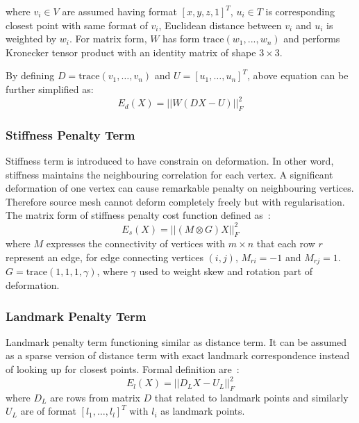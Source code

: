 where $v_i \in V$ are assumed having format $[x,y,z,1]^T$, $u_i \in T$ is corresponding closest point with same format of $v_i$, Euclidean distance between $v_i$ and $u_i$ is weighted by $w_i$. For matrix form, $W$ has form $\text{trace}(w_1,...,w_n)$ and performs Kronecker tensor product with an identity matrix of shape $3 \times 3$. 

By defining $D = \text{trace}(v_1,\dotsc,v_n)$ and $U=[u_1,\dotsc,u_n]^T$, above equation can be further simplified as:
\begin{equation}
E_d(X) = ||W(DX-U)||^2_F
\end{equation}

\subsubsection{Stiffness Penalty Term}
\label{sec:nicpst}

Stiffness term is introduced to have constrain on deformation. In other word, stiffness maintains the neighbouring  correlation for each vertex. A significant deformation of one vertex can cause remarkable penalty on neighbouring vertices. Therefore source mesh cannot deform completely freely but with regularisation. The matrix form of stiffness penalty cost function defined as~\cite{Amberg2007}:
\begin{equation}
E_s(X)=||(M \otimes G)X||^2_F
\end{equation}
where $M$ expresses the connectivity of vertices with $m \times n$ that each row $r$ represent an edge, for edge connecting vertices $(i,j)$, $M_{ri}=-1$ and $M_{rj}=1$. $G=\text{trace}(1,1,1,\gamma)$, where $\gamma$ used to weight skew and rotation part of deformation.

\subsubsection{Landmark Penalty Term}
\label{sec:nicplt}

Landmark penalty term functioning similar as distance term. It can be assumed as a sparse version of distance term with exact landmark correspondence instead of looking up for closest points. Formal definition are~\cite{Amberg2007}:
\begin{equation}
E_l(X)=||D_LX-U_L||^2_F
\end{equation}
where $D_L$ are rows from matrix $D$ that related to landmark points and similarly $U_L$ are of format $[l_1,\dotsc,l_l]^T$ with $l_i$ as landmark points.

